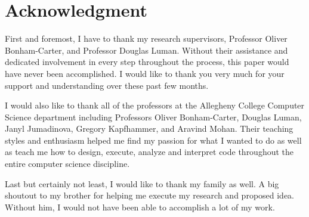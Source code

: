 \chapter*{Acknowledgment} 

First and foremost, I have to thank my research supervisors, Professor Oliver Bonham-Carter, and Professor Douglas Luman. Without their assistance and dedicated involvement in every step throughout the process, this paper would have never been accomplished. I would like to thank you very much for your support and understanding over these past few months. 

\bigskip

I would also like to thank all of the professors at the Allegheny College Computer Science department including Professors Oliver Bonham-Carter, Douglas Luman, Janyl Jumadinova, Gregory Kapfhammer, and Aravind Mohan. Their teaching styles and enthusiasm helped me find my passion for what I wanted to do as well as teach me how to design, execute, analyze and interpret code throughout the entire computer science discipline.

\bigskip

Last but certainly not least, I would like to thank my family as well. A big shoutout to my brother for helping me execute my research and proposed idea. Without him, I would not have been able to accomplish a lot of my work.

